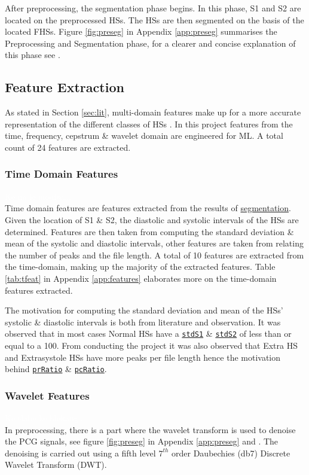 \documentclass[10pt,twocolumn]{witseiepaper}
\begin{document}
After preprocessing, the segmentation phase begins. In this phase, S1 and S2 are located on the preprocessed HSs. The HSs are then segmented on the basis of the located FHSs. Figure \ref{fig:preseg} in Appendix \ref{app:preseg} summarises the Preprocessing and Segmentation phase, for a clearer and concise explanation of this phase see \cite{love}.

\subsection{Feature Extraction}
\label{sec:feat}
As stated in Section \ref{sec:lit}, multi-domain features make up for a more accurate representation of the different classes of HSs \cite{22}. In this project features from the time, frequency, cepstrum \& wavelet domain are engineered for ML. A total count of 24 features are extracted.

\subsubsection{Time Domain Features}
\textcolor{white}{Ke na le modisa...}\\
Time domain features are features extracted from the results of \hyperref[sec:preseg]{segmentation}. Given the location of S1 \& S2, the diastolic and systolic intervals of the HSs are determined. Features are then taken from computing the standard deviation \& mean of the systolic and diastolic intervals, other features are taken from relating the number of peaks and the file length. A total of 10 features are extracted from the time-domain, making up the majority of the extracted features. Table \ref{tab:tfeat} in Appendix \ref{app:features} elaborates more on the time-domain features extracted.

The motivation for computing the standard deviation and mean of the HSs' systolic \& diastolic intervals is both from literature \cite{gomes2012classifying,bentley} and observation. It was observed that in most cases Normal HSs have a \hyperref[t:s1]{\texttt{stdS1}} \& \hyperref[t:s2]{\texttt{stdS2}} of less than or equal to a 100. From conducting the project it was also observed that Extra HS and Extrasystole HSs have more peaks per file length hence the motivation behind \hyperref[t:pr]{\texttt{prRatio}} \& \hyperref[t:pc]{\texttt{pcRatio}}.

\subsubsection{Wavelet Features}
\textcolor{white}{Ke tlabe ke hlokang...}\\
In preprocessing, there is a part where the wavelet transform is used to denoise the PCG signals, see figure \ref{fig:preseg} in Appendix \ref{app:preseg} and \cite{love}. The denoising is carried out using a fifth level $7^{th}$ order Daubechies (db7) Discrete Wavelet Transform (DWT). 
\end{document}
